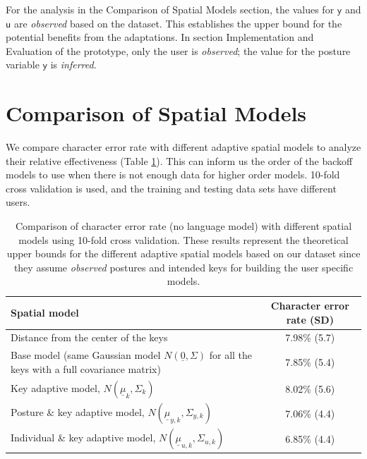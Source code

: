\documentclass{sigchi}
\newcommand\tabhead[1]{\small\textbf{#1}}
\begin{document}
For the analysis in the Comparison of Spatial Models section, the values for $\textsf{y}$ and $\textsf{u}$ are 
\textit{observed} based on the dataset. This establishes the upper bound for the potential benefits from the adaptations. In section Implementation and Evaluation of the prototype, only the user is \textit{observed}; the value for the posture variable $\textsf{y}$ is \textit{inferred}.

\section{Comparison of Spatial Models}
We compare character error rate with different adaptive spatial models to analyze their
relative effectiveness (Table \ref{tab:comparison}). This can inform us the order of the
backoff models to use when there is not enough data for higher order models.
10-fold cross validation is used, and the training and testing data sets have different users.

\begin{table} [tb]
  \centering
  \begin{tabular}{|l|c|}
    \hline
    \tabhead{Spatial model} &
    \multicolumn{1}{|p{0.2\columnwidth}|}{\centering\tabhead{Character
    error rate (SD)}} \\
    \hline
    Distance from the center of the keys & 7.98\% (5.7) \\
    \hline
    \multicolumn{1}{|p{0.7\columnwidth}|}{Base model (same Gaussian model $N(\underline 0, \Sigma)$ for
    all the keys with a full covariance matrix)} & 7.85\% (5.4) \\
    \hline
    \multicolumn{1}{|p{0.7\columnwidth}|}{Key adaptive model, $N(\underline
    \mu_k, \Sigma_k)$} & 8.02\% (5.6) \\
    \hline
    \multicolumn{1}{|p{0.7\columnwidth}|}{Posture \& key adaptive model,
    $N(\underline \mu_{y,k}, \Sigma_{y,k})$} & 7.06\% (4.4) \\
    \hline
     \multicolumn{1}{|p{0.7\columnwidth}|}{Individual \& key adaptive model,
     $N(\underline \mu_{u,k}, \Sigma_{u,k})$} & 6.85\% (4.4) \\
    \hline
  \end{tabular}
  \caption{Comparison of character error rate (no language model) with
  different spatial models using 10-fold cross validation. These results represent the theoretical upper bounds for the different adaptive spatial models based on our dataset since they assume \textit{observed} postures and intended keys for building the user specific models.}
  \label{tab:comparison}
\end{table}
\end{document}
